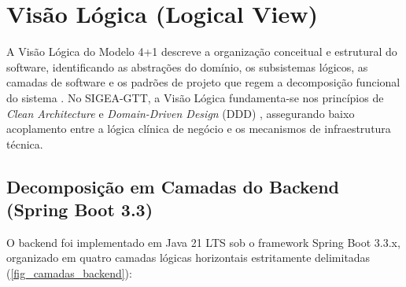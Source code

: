 \chapter{Visão Lógica (Logical View)}
\label{cap_visao_logica}

A Visão Lógica do Modelo 4+1 descreve a organização conceitual e estrutural do software, identificando as abstrações do domínio, os subsistemas lógicos, as camadas de software e os padrões de projeto que regem a decomposição funcional do sistema \cite{kruchten1995,martin2018}. No SIGEA-GTT, a Visão Lógica fundamenta-se nos princípios de \textit{Clean Architecture} e \textit{Domain-Driven Design} (DDD) \cite{evans2003}, assegurando baixo acoplamento entre a lógica clínica de negócio e os mecanismos de infraestrutura técnica.

\section{Decomposição em Camadas do Backend (Spring Boot 3.3)}
\label{sec_camadas_backend}

O backend foi implementado em Java 21 LTS sob o framework Spring Boot 3.3.x, organizado em quatro camadas lógicas horizontais estritamente delimitadas (\autoref{fig_camadas_backend}):

